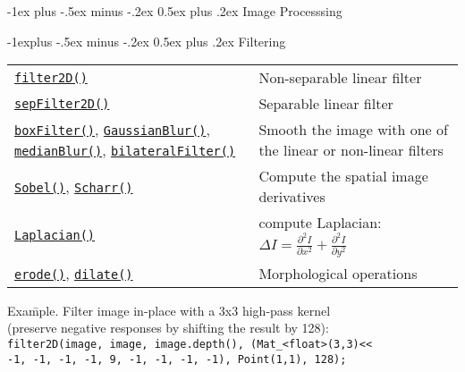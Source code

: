 \documentclass[10pt,landscape]{article}
\makeatletter
\renewcommand{\section}{\@startsection{section}{1}{0mm}%
                                {-1ex plus -.5ex minus -.2ex}%
                                {0.5ex plus .2ex}%
                                {\normalfont\large\bfseries}}
\renewcommand{\subsection}{\@startsection{subsection}{2}{0mm}%
                                {-1explus -.5ex minus -.2ex}%
                                {0.5ex plus .2ex}%
                                {\normalfont\normalsize\bfseries}}
\makeatother
\begin{document}
\begin{multicols}{3}
\section{Image Processsing}

\subsection{Filtering}

\begin{tabular}{@{}p{\the\MyLen}%
                @{}p{\linewidth-\the\MyLen}@{}}
\texttt{\href{http://docs.opencv.org/modules/imgproc/doc/filtering.html\#filter2d}{filter2D()}} & Non-separable linear filter \\

\texttt{\href{http://docs.opencv.org/modules/imgproc/doc/filtering.html\#sepfilter2d}{sepFilter2D()}} & Separable linear filter \\

\texttt{\href{http://docs.opencv.org/modules/imgproc/doc/filtering.html\#blur}{boxFilter()}},  \texttt{\href{http://docs.opencv.org/modules/imgproc/doc/filtering.html\#gaussianblur}{GaussianBlur()}},
\texttt{\href{http://docs.opencv.org/modules/imgproc/doc/filtering.html\#medianblur}{medianBlur()}},
\texttt{\href{http://docs.opencv.org/modules/imgproc/doc/filtering.html\#bilateralfilter}{bilateralFilter()}}
& Smooth the image with one of the linear or non-linear filters \\

\texttt{\href{http://docs.opencv.org/modules/imgproc/doc/filtering.html\#sobel}{Sobel()}},  \texttt{\href{http://docs.opencv.org/modules/imgproc/doc/filtering.html\#scharr}{Scharr()}}
& Compute the spatial image derivatives \\
\texttt{\href{http://docs.opencv.org/modules/imgproc/doc/filtering.html\#laplacian}{Laplacian()}} & compute Laplacian: $\Delta I = \frac{\partial ^ 2 I}{\partial x^2} + \frac{\partial ^ 2 I}{\partial y^2}$  \\

\texttt{\href{http://docs.opencv.org/modules/imgproc/doc/filtering.html\#erode}{erode()}}, \texttt{\href{http://docs.opencv.org/modules/imgproc/doc/filtering.html\#dilate}{dilate()}} & Morphological operations \\

\end{tabular}

\begin{tabbing}
Exa\=mple. Filter image in-place with a 3x3 high-pass kernel\\
\> (preserve negative responses by shifting the result by 128):\\
\texttt{filter2D(image, image, image.depth(), (Mat\_<float>(3,3)<<}\\
\> \texttt{-1, -1, -1, -1, 9, -1, -1, -1, -1), Point(1,1), 128);}\\
\end{tabbing}


\end{multicols}
\end{document}

